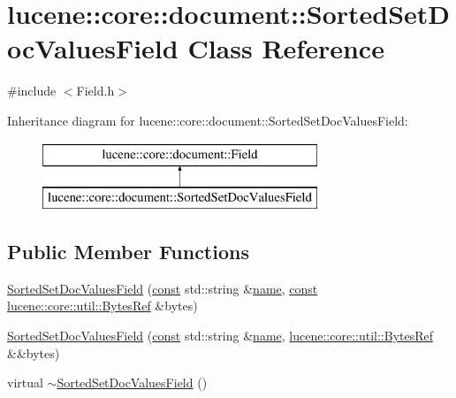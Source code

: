 \hypertarget{classlucene_1_1core_1_1document_1_1SortedSetDocValuesField}{}\section{lucene\+:\+:core\+:\+:document\+:\+:Sorted\+Set\+Doc\+Values\+Field Class Reference}
\label{classlucene_1_1core_1_1document_1_1SortedSetDocValuesField}


{\ttfamily \#include $<$Field.\+h$>$}

Inheritance diagram for lucene\+:\+:core\+:\+:document\+:\+:Sorted\+Set\+Doc\+Values\+Field\+:\begin{figure}[H]
\begin{center}
\leavevmode
\includegraphics[height=2.000000cm]{classlucene_1_1core_1_1document_1_1SortedSetDocValuesField}
\end{center}
\end{figure}
\subsection*{Public Member Functions}
\begin{DoxyCompactItemize}
\item 
\mbox{\hyperlink{classlucene_1_1core_1_1document_1_1SortedSetDocValuesField_a606d942fd2669a07d9ed7fa7575e7248}{Sorted\+Set\+Doc\+Values\+Field}} (\mbox{\hyperlink{ZlibCrc32_8h_a2c212835823e3c54a8ab6d95c652660e}{const}} std\+::string \&\mbox{\hyperlink{classlucene_1_1core_1_1document_1_1Field_a52f673f3b3abb14b180f5159f4726537}{name}}, \mbox{\hyperlink{ZlibCrc32_8h_a2c212835823e3c54a8ab6d95c652660e}{const}} \mbox{\hyperlink{classlucene_1_1core_1_1util_1_1BytesRef}{lucene\+::core\+::util\+::\+Bytes\+Ref}} \&bytes)
\item 
\mbox{\hyperlink{classlucene_1_1core_1_1document_1_1SortedSetDocValuesField_a5a10fe1cd30b6c1d0803430058b7c808}{Sorted\+Set\+Doc\+Values\+Field}} (\mbox{\hyperlink{ZlibCrc32_8h_a2c212835823e3c54a8ab6d95c652660e}{const}} std\+::string \&\mbox{\hyperlink{classlucene_1_1core_1_1document_1_1Field_a52f673f3b3abb14b180f5159f4726537}{name}}, \mbox{\hyperlink{classlucene_1_1core_1_1util_1_1BytesRef}{lucene\+::core\+::util\+::\+Bytes\+Ref}} \&\&bytes)
\item 
virtual \mbox{\hyperlink{classlucene_1_1core_1_1document_1_1SortedSetDocValuesField_af3650bc6499d15f6f1f6b744200423a8}{$\sim$\+Sorted\+Set\+Doc\+Values\+Field}} ()
\end{DoxyCompactItemize}
